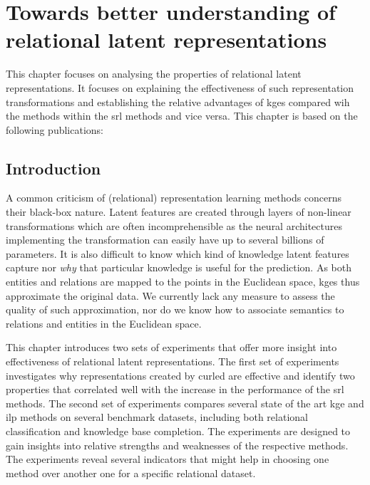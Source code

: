 \chapter{Towards better understanding of relational latent representations}\label{ch:embeddinganalysis}


This chapter focuses on analysing the properties of relational latent representations.
It focuses on explaining the effectiveness of such representation transformations and establishing the relative advantages of \gls{kge}s compared wih the methods within the \gls{srl} methods and vice versa.
This chapter is based on the following publications:

\begin{quote}
\end{quote}


\begin{quote}
\end{quote}

\begin{quote}
\end{quote}

\section{Introduction}





A common criticism of  (relational) representation learning methods concerns their black-box nature.
Latent features are created through layers of non-linear transformations which are often incomprehensible as the neural architectures implementing the transformation can easily have up to several billions of parameters.
It is also difficult to know which kind of knowledge latent features capture nor \textit{why} that particular knowledge is useful for the prediction.
As both entities and relations are mapped to the points in the Euclidean space, \gls{kge}s thus approximate the original data.
We currently lack any measure to assess the quality of such approximation, nor do we know how to associate semantics to relations and entities in the Euclidean space.



This chapter introduces two sets of experiments that offer more insight into effectiveness of relational latent representations.
The first set of experiments investigates why representations created by \gls{curled} are effective and identify two properties that correlated well with the increase in the performance of the \gls{srl} methods.
The second set of experiments compares several state of the art \gls{kge} and \gls{ilp} methods on several benchmark datasets, including both relational classification and knowledge base completion.
The experiments are designed to gain insights into relative strengths and weaknesses of the respective methods.
The experiments reveal several indicators that might help in choosing one method over another one for a specific  relational dataset.






